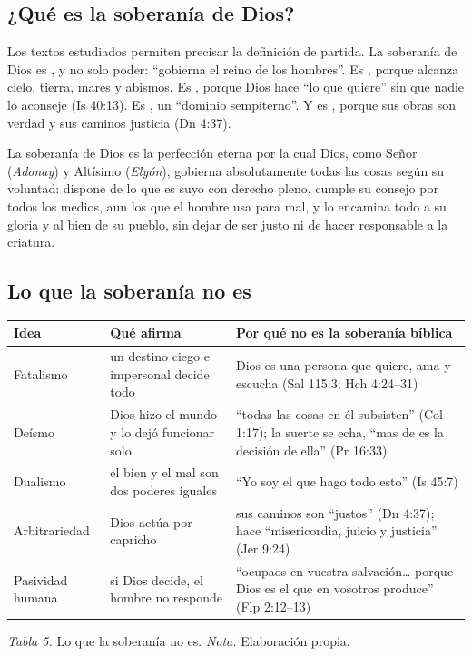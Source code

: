\subsection{¿Qué es la soberanía de Dios?}
Los textos estudiados permiten precisar la definición de partida. La soberanía de Dios es , y no solo poder: ``gobierna el reino de los hombres''. Es , porque alcanza cielo, tierra, mares y abismos. Es , porque Dios hace ``lo que quiere'' sin que nadie lo aconseje (Is 40:13). Es , un ``dominio sempiterno''. Y es , porque sus obras son verdad y sus caminos justicia (Dn 4:37).

\begin{tcolorbox}[colback=azul!5!white,colframe=azul,boxrule=1pt,arc=3pt,title={\small Definición},colbacktitle=azul,coltitle=white]
La soberanía de Dios es la perfección eterna por la cual Dios, como Señor (\emph{Adonay}) y Altísimo (\emph{Elyón}), gobierna absolutamente todas las cosas según su voluntad: dispone de lo que es suyo con derecho pleno, cumple su consejo por todos los medios, aun los que el hombre usa para mal, y lo encamina todo a su gloria y al bien de su pueblo, sin dejar de ser justo ni de hacer responsable a la criatura.
\end{tcolorbox}


\subsection{Lo que la soberanía no es}
\begin{center}\small\renewcommand{\arraystretch}{1.2}
\begin{tabular}{@{}L{2.6cm}L{4.8cm}L{6.4cm}@{}}
\toprule
\textbf{Idea} & \textbf{Qué afirma} & \textbf{Por qué no es la soberanía bíblica} \\ \midrule
Fatalismo & un destino ciego e impersonal decide todo & Dios es una persona que quiere, ama y escucha (Sal 115:3; Hch 4:24--31) \\
Deísmo & Dios hizo el mundo y lo dejó funcionar solo & ``todas las cosas en él subsisten'' (Col 1:17); la suerte se echa, ``mas de \SENOR{} es la decisión de ella'' (Pr 16:33) \\
Dualismo & el bien y el mal son dos poderes iguales & ``Yo \SENOR{} soy el que hago todo esto'' (Is 45:7) \\
Arbitrariedad & Dios actúa por capricho & sus caminos son ``justos'' (Dn 4:37); hace ``misericordia, juicio y justicia'' (Jer 9:24) \\
Pasividad humana & si Dios decide, el hombre no responde & ``ocupaos en vuestra salvación\ldots{} porque Dios es el que en vosotros produce'' (Flp 2:12--13) \\
\bottomrule
\end{tabular}\par
{\footnotesize\color{gris}\textit{Tabla 5.} Lo que la soberanía no es. \textit{Nota.} Elaboración propia.}
\end{center}

